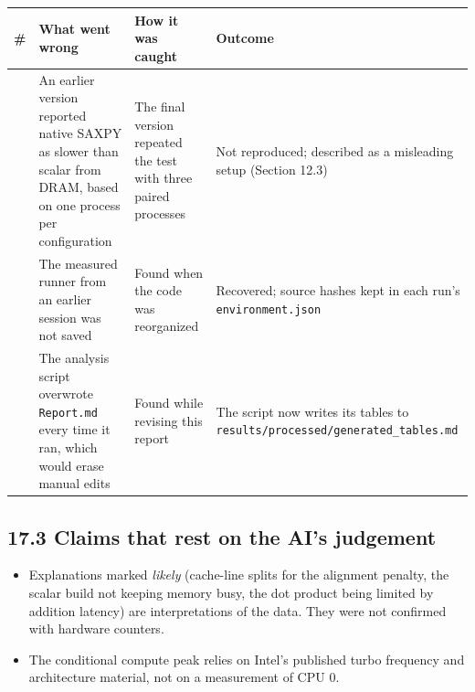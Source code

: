 \documentclass[10pt,letterpaper]{article}
\begin{document}
{\footnotesize\begin{longtable}{>{\raggedright\arraybackslash}p{0.0254\dimexpr\linewidth-8\tabcolsep\relax}>{\raggedright\arraybackslash}p{0.3249\dimexpr\linewidth-8\tabcolsep\relax}>{\raggedright\arraybackslash}p{0.3249\dimexpr\linewidth-8\tabcolsep\relax}>{\raggedright\arraybackslash}p{0.3249\dimexpr\linewidth-8\tabcolsep\relax}}\toprule
\textbf{\#} & \textbf{What went wrong} & \textbf{How it was caught} & \textbf{Outcome} \\ \midrule\endhead
1 & An earlier version reported native SAXPY as slower than scalar from DRAM, based on one process per configuration & The final version repeated the test with three paired processes & Not reproduced; described as a misleading setup (Section 12.3) \\
2 & The measured runner from an earlier session was not saved & Found when the code was reorganized & Recovered; source hashes kept in each run's \texttt{environment.json} \\
3 & The analysis script overwrote \texttt{Report.md} every time it ran, which would erase manual edits & Found while revising this report & The script now writes its tables to \texttt{results/processed/generated\_tables.md} \\
\bottomrule\end{longtable}}

\subsection*{17.3 Claims that rest on the AI's judgement}

\begin{itemize}\setlength{\itemsep}{2pt}

\item Explanations marked \textit{likely} (cache-line splits for the alignment penalty, the scalar build not keeping memory busy, the dot product being limited by addition latency) are interpretations of the data. They were not confirmed with hardware counters.

\item The conditional compute peak relies on Intel's published turbo frequency and architecture material, not on a measurement of CPU 0.

\end{itemize}

\end{document}
